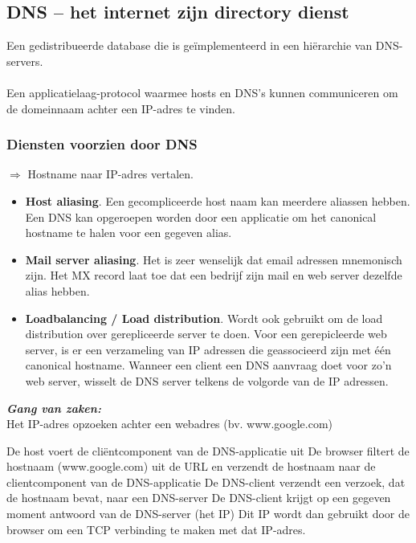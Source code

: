 \subsection{DNS – het internet zijn directory dienst}

Een gedistribueerde database die is geïmplementeerd in een hiërarchie van DNS-servers.\\\\
Een applicatielaag-protocol waarmee hosts en DNS’s kunnen communiceren om de domeinnaam achter een IP-adres te vinden.

\subsubsection{Diensten voorzien door DNS}

$\Rightarrow$ Hostname naar IP-adres vertalen.


\begin{itemize}
  \item \textbf{Host aliasing}. Een gecompliceerde host naam kan meerdere aliassen hebben. Een DNS kan opgeroepen worden door een applicatie om het canonical hostname te halen voor een gegeven alias.
\item \textbf{Mail server aliasing}. Het is zeer wenselijk dat email adressen mnemonisch zijn. Het MX record laat toe dat een bedrijf zijn mail en web server dezelfde alias hebben.
\item \textbf{Loadbalancing / Load distribution}. Wordt ook gebruikt om de load distribution over gerepliceerde server te doen. Voor een gerepicleerde web server, is er een verzameling van IP adressen die geassocieerd zijn met één canonical hostname. Wanneer een client een DNS aanvraag doet voor zo’n web server, wisselt de DNS server telkens de volgorde van de IP adressen.
\end{itemize}

\noindent \textit{\textbf{Gang van zaken:}}\\

\noindent Het IP-adres opzoeken achter een webadres (bv. www.google.com)

\be
\itf De host voert de cliëntcomponent van de DNS-applicatie uit
\itf De browser filtert de hostnaam (www.google.com) uit de URL en verzendt de hostnaam naar de clientcomponent van de DNS-applicatie
\itf De DNS-client verzendt een verzoek, dat de hostnaam bevat, naar een DNS-server
\itf De DNS-client krijgt op een gegeven moment antwoord van de DNS-server (het IP)
\itf Dit IP wordt dan gebruikt door de browser om een TCP verbinding te maken met dat IP-adres.
\ee

